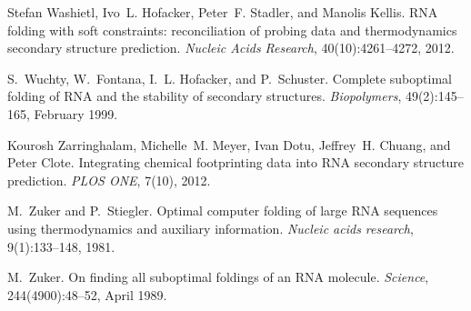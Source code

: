 \begin{DoxyDescription}
\item[\label{_CITEREF_washietl:2012}%
\mbox{[}16\mbox{]}]Stefan Washietl, Ivo~L. Hofacker, Peter~F. Stadler, and Manolis Kellis. R\+N\+A folding with soft constraints\+: reconciliation of probing data and thermodynamics secondary structure prediction. {\itshape Nucleic Acids Research}, 40(10)\+:4261--4272, 2012.


\item[\label{_CITEREF_wuchty:1999}%
\mbox{[}17\mbox{]}]S.~Wuchty, W.~Fontana, I.~L. Hofacker, and P.~Schuster. Complete suboptimal folding of R\+N\+A and the stability of secondary structures. {\itshape Biopolymers}, 49(2)\+:145--165, February 1999.


\item[\label{_CITEREF_zarringhalam:2012}%
\mbox{[}18\mbox{]}]Kourosh Zarringhalam, Michelle~M. Meyer, Ivan Dotu, Jeffrey~H. Chuang, and Peter Clote. Integrating chemical footprinting data into R\+N\+A secondary structure prediction. {\itshape P\+L\+O\+S O\+N\+E}, 7(10), 2012.


\item[\label{_CITEREF_zuker:1981}%
\mbox{[}19\mbox{]}]M.~Zuker and P.~Stiegler. Optimal computer folding of large R\+N\+A sequences using thermodynamics and auxiliary information. {\itshape Nucleic acids research}, 9(1)\+:133--148, 1981.


\item[\label{_CITEREF_zuker:1989}%
\mbox{[}20\mbox{]}]M.~Zuker. On finding all suboptimal foldings of an R\+N\+A molecule. {\itshape Science}, 244(4900)\+:48--52, April 1989.


\end{DoxyDescription}